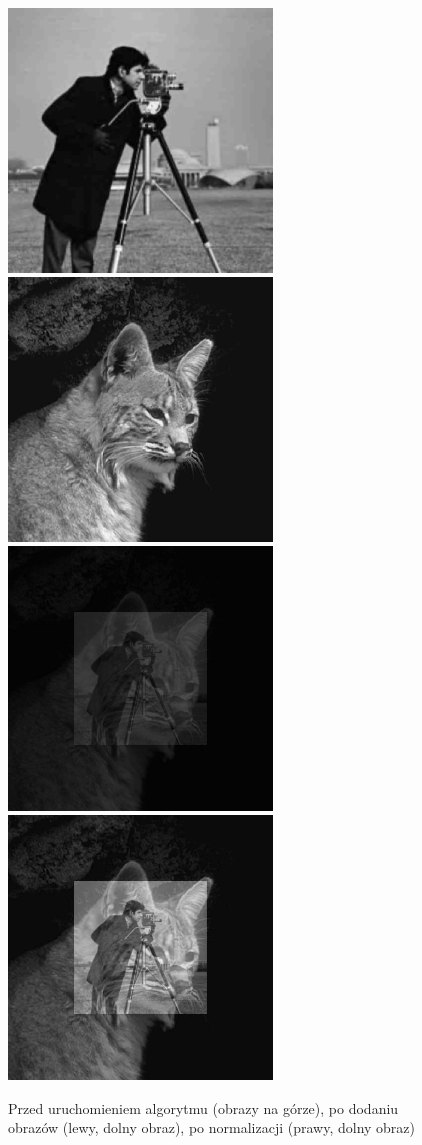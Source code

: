 \documentclass[a4paper,12pt]{book}
\begin{document}
\begin{figure}[H]
	\caption{Przed uruchomieniem algorytmu (obrazy na górze), po dodaniu obrazów (lewy, dolny obraz), po normalizacji (prawy, dolny obraz)}
	\includegraphics[width=7cm, height=7cm]{man-unmodified.jpg}
	\includegraphics[width=7cm, height=7cm]{cat-unmodified.jpg}
	\includegraphics[width=7cm, height=7cm]{2/sum-gray-images-2.png}
	\includegraphics[width=7cm, height=7cm]{2/sum-gray-images-2-norm.png}
\end{figure}
\end{document}
